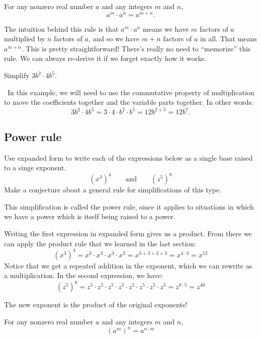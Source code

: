 \begin{boxeddef}
For any nonzero real number $a$ and any integers $m$ and $n$, \[a^m \cdot a^n = a^{m+n}.\]
\end{boxeddef}

The intuition behind this rule is that $a^m \cdot a^n$ means we have $m$ factors of $a$ multiplied by $n$ factors of $a$, and so we have $m+n$ factors of $a$ in all. That means $a^{m+n}$. This is pretty straightforward! There's really no need to ``memorize'' this rule. We can always re-derive it if we forget exactly how it works.

\begin{boxedex}
Simplify $3b^2 \cdot 4b^5.$

\exsoln\ In this example, we will need to use the commutative property of multiplication to move the coefficients together and the variable parts together. In other words: \[3b^2 \cdot 4b^5 = 3\cdot4\cdot b^2 \cdot b^5 = 12b^{2+5} = 12b^7.\]
\end{boxedex}


\subsection{Power rule}

\begin{boxedexplore}
Use expanded form to write each of the expressions below as a single base raised to a singe exponent.
\[(x^3)^4 \qquad\text{and}\qquad (z^5)^8\]
Make a conjecture about a general rule for simplifications of this type.
\end{boxedexplore}

This simplification is called the power rule, since it applies to situations in which we have a power which is itself being raised to a power.

Writing the first expression in expanded form gives us a product. From there we can apply the product rule that we learned in the last section:
\[(x^3)^4 = x^3 \cdot x^3 \cdot x^3 \cdot x^3 = x^{3+3+3+3} = x^{4\cdot3} = x^{12}\]
Notice that we get a repeated addition in the exponent, which we can rewrite as a multiplication. In the second expression, we have:
\[(z^5)^8 = z^5 \cdot z^5 \cdot z^5 \cdot z^5 \cdot z^5 \cdot z^5 \cdot z^5 \cdot z^5 = z^{8\cdot5} = z^{40}\]

The new exponent is the product of the original exponents!

\begin{boxeddef}
For any nonzero real number $a$ and any integers $m$ and $n$, \[(a^m)^n = a^{n \cdot m}\]
\end{boxeddef}

